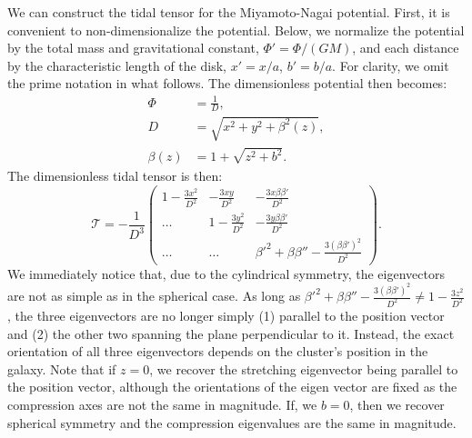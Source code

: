             We can construct the tidal tensor for the Miyamoto-Nagai potential. First, it is convenient to non-dimensionalize the potential. Below, we normalize the potential by the total mass and gravitational constant, $\Phi\prime = \Phi / (GM)$, and each distance by the characteristic length of the disk, $x' = x/a$, $b' = b/a$. For clarity, we omit the prime notation in what follows. The dimensionless potential then becomes:            
            \begin{eqnarray}
                \Phi   &= \frac{1}{D},\\
                D       &= \sqrt{x^2 + y^2 + \beta^2(z)},\\
                \beta(z)   &= 1 + \sqrt{z^2 + b^2}.
            \end{eqnarray}
            The dimensionless tidal tensor is then: 
            \begin{equation}
                \mathcal{T}=-\frac{1}{D^3}\left(\begin{matrix}
                    1-\frac{3x^2}{D^2} & -\frac{3xy}{D^2} & -\frac{3x\beta \beta'}{D^2} \\
                    \dots & 1-\frac{3y^2}{D^2} & -\frac{3y\beta \beta'}{D^2} \\
                    \dots & \dots & \beta'^2 + \beta \beta'' -\frac{3\left(\beta\beta'\right)^2}{D^2}
                \end{matrix}\right).
            \end{equation}             
            We immediately notice that, due to the cylindrical symmetry, the eigenvectors are not as simple as in the spherical case. As long as $\beta'^2 + \beta \beta'' -\frac{3\left(\beta\beta'\right)^2}{D^2} \neq 1-\frac{3z^2}{D^2}$, the three eigenvectors are no longer simply (1) parallel to the position vector and (2) the other two spanning the plane perpendicular to it. Instead, the exact orientation of all three eigenvectors depends on the cluster's position in the galaxy. Note that if $z=0$, we recover the stretching eigenvector being parallel to the position vector, although the orientations of the eigen vector are fixed as the compression axes are not the same in magnitude. If, we $b=0$, then we recover spherical symmetry and the compression eigenvalues are the same in magnitude.

